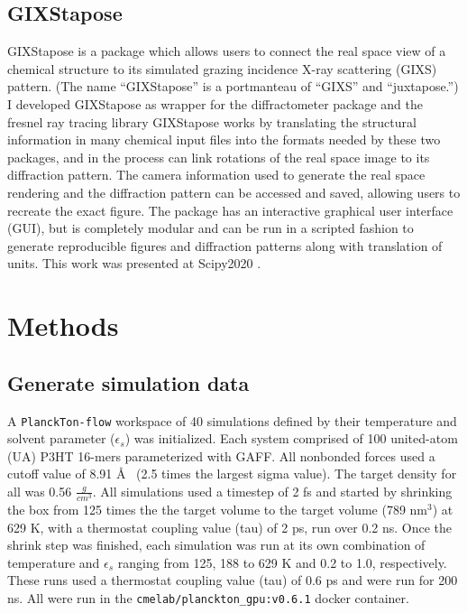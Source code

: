 \subsection{GIXStapose}
GIXStapose is a package which allows users to connect the real space view of a chemical structure to its simulated grazing incidence X-ray scattering (GIXS) pattern. (The name ``GIXStapose'' is a portmanteau of ``GIXS'' and ``juxtapose.'') 
I developed GIXStapose as wrapper for the diffractometer package and the fresnel ray tracing library \cite{Diffract, Jones2017, fresnel}
GIXStapose works by translating the structural information in many chemical input files into the formats needed by these two packages, and in the process can link rotations of the real space image to its diffraction pattern. 
The camera information used to generate the real space rendering and the diffraction pattern can be accessed and saved, allowing users to recreate the exact figure.
The package has an interactive graphical user interface (GUI), but is completely modular and can be run in a scripted fashion to generate reproducible figures and diffraction patterns along with translation of units. 
This work was presented at Scipy2020 \cite{gixstapose-scipy}. 

\section{Methods}
\subsection{Generate simulation data}
A \texttt{PlanckTon-flow} workspace of 40 simulations defined by their temperature and solvent parameter ($\epsilon_{s}$) was initialized. Each system comprised of 100 united-atom (UA) P3HT 16-mers parameterized with GAFF. %
All nonbonded forces used a cutoff value of 8.91 \AA~ (2.5 times the largest sigma value). The target density for all was 0.56 $\frac{g}{cm^{3}}$. All simulations used a timestep of 2 fs and started by shrinking the box from 125 times the the target volume to the target volume (789 nm$^3$) at 629 K, with a thermostat coupling value (tau) of 2 ps, run over 0.2 ns. Once the shrink step was finished, each simulation was run at its own combination of temperature and $\epsilon_{s}$ ranging from 125, 188 to 629 K and 0.2 to 1.0, respectively. These runs used a thermostat coupling value (tau) of 0.6 ps and were run for 200 ns. All were run in the \lstinline{cmelab/planckton_gpu:v0.6.1} docker container.

